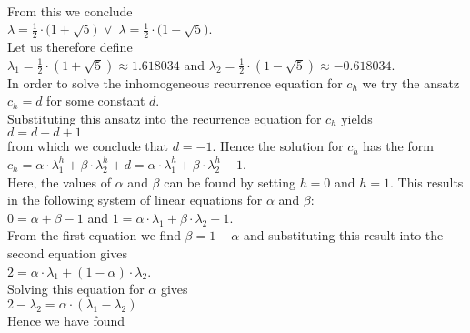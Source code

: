 \\[0.2cm]
From this we conclude 
\\[0.2cm]
\hspace*{1.3cm}
$\lambda = \frac{1}{2} \cdot \bigl(1 + \sqrt{5}\bigr) \;\vee\; \lambda = \frac{1}{2} \cdot \bigl(1 - \sqrt{5}\bigr)$.
\\[0.2cm]
Let us therefore define 
\\[0.2cm]
\hspace*{1.3cm}
$\lambda_1 =  \frac{1}{2} \cdot (1 + \sqrt{5}) \approx  1.618034$ \quad and \quad 
$\lambda_2 = \frac{1}{2} \cdot (1 - \sqrt{5}) \approx -0.618034$.
\\[0.2cm]
In order to solve the inhomogeneous recurrence equation for $c_h$ we try the ansatz
\\[0.2cm]
\hspace*{1.3cm}
$c_h = d$ \quad for some constant $d$.
\\[0.2cm]
Substituting this ansatz into the recurrence equation for $c_h$ yields
\\[0.2cm]
\hspace*{1.3cm}
$d = d + d + 1$
\\[0.2cm]
from which we conclude that $d = -1$.  Hence the solution for $c_h$ has the form
\\[0.2cm]
\hspace*{1.3cm}
$c_h = \alpha \cdot \lambda_1^h + \beta \cdot \lambda_2^h + d =\alpha \cdot \lambda_1^h + \beta \cdot \lambda_2^h - 1$.
\\[0.2cm]
Here, the values of $\alpha$ and $\beta$ can be found by setting $h=0$ and $h=1$.  This results in
the following system of linear equations for  $\alpha$ and $\beta$:
\\[0.2cm]
\hspace*{1.3cm}
$0 = \alpha + \beta - 1$ \quad and \quad
$1 = \alpha \cdot \lambda_1 + \beta \cdot \lambda_2 - 1$.
\\[0.2cm]
From the first equation we find $\beta = 1-\alpha$ and substituting this result into the second equation
gives
\\[0.2cm]
\hspace*{1.3cm}
$2 = \alpha \cdot \lambda_1 + (1-\alpha) \cdot \lambda_2$.
\\[0.2cm]
Solving this equation for $\alpha$ gives
\\[0.2cm]
\hspace*{1.3cm}
$2 - \lambda_2 = \alpha \cdot (\lambda_1 - \lambda_2)$
\\[0.2cm]
Hence we have found
\\[0.2cm]
